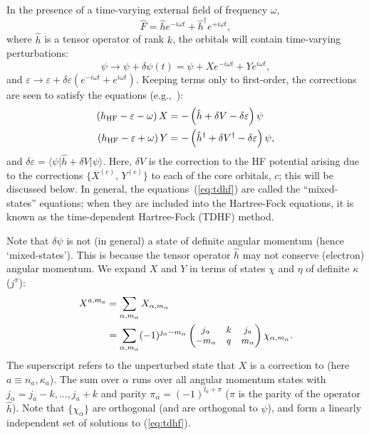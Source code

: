 \documentclass[10pt,twocolumn,a4paper]{article}%
\newcommand{\bra}[1]{\ensuremath{\langle #1|}}	%
\newcommand{\ket}[1]{\ensuremath{|#1\rangle}}	%
\newcommand{\threej}[6]{\small\ensuremath{\begin{pmatrix}#1&#2&#3\\#4&#5&#6\end{pmatrix}}}	%
\newcommand{\be}{\begin{equation}}
\newcommand{\ee}{\end{equation}}
\def\en{\ensuremath{\varepsilon}}
\renewcommand{\a}{\ensuremath{\alpha}}
\renewcommand{\k}{\ensuremath{\kappa}}
\newcommand{\w}{\ensuremath{\omega}}
\begin{document}
In the presence of a time-varying external field of frequency $\omega$,
\be
\hat F = \hat h e^{-i\w t} +  \hat h^\dag e^{+i\w t} ,
\ee
where $\hat h$ is a tensor operator of rank $k$, 
 the orbitals will contain time-varying perturbations:
\be\label{eq:tdhf-dPsi}
\psi \to \psi + \delta\psi(t) = \psi +  X e^{- i\w t}+ Y e^{ i\w t},
\ee
and $\en\to\en+\delta\en (e^{- i\w t}+ e^{ i\w t})$.
Keeping terms only to first-order, the corrections are seen to satisfy the equations (e.g.,~\cite{DzubaHFS1984}):
\begin{equation}\begin{split}
\label{eq:tdhf}
\left( h_{\rm HF} - \en -\w \right)X &= -\left(\hat h + \delta V - \delta \en \right)\psi \\
\left( h_{\rm HF} - \en +\w \right)Y &= -\left(\hat h^\dag + \delta V^\dag - \delta \en \right)\psi ,
\end{split}\end{equation}
and $\delta\en = \bra{\psi}\hat h + \delta V\ket{\psi}$.
%
Here, $\delta V$ is the correction to the HF potential arising due to the corrections $\{X^{(c)},\,Y^{(c)}\}$ to each of the core orbitals, $c$; this will be discussed below.
In general, the equations~(\ref{eq:tdhf}) are called the ``mixed-states'' equations; when they are included into the Hartree-Fock equations, it is known as the time-dependent Hartree-Fock (TDHF) method.

Note that $\delta\psi$ is not (in general) a state of definite angular momentum (hence `mixed-states').
This is because the tensor operator $\hat h$ may not conserve (electron) angular momentum.
We expand $X$ and $Y$ in terms of states $\chi$ and $\eta$ of definite $\k$ ($j^\pi$):
\begin{equation}\begin{split}
\label{eq:dPsi-pw}
X^{a,m_a} &= \sum_{\a,m_\a} X_{\a,m_\a}\\
 &= \sum_{\a,m_\a}(-1)^{j_\a-m_\a}\threej{j_\a}{k}{j_a}{-m_\a}{q}{m_\a}\chi_{\a, m_\a}.
\end{split}\end{equation}
The superscript refers to the unperturbed state that $X$ is a correction to (here $a\equiv n_a,\k_a$).
The sum over $\alpha$ runs over all angular momentum states with $j_\alpha = j_a - k, ..., j_a+k$ and parity $\pi_\alpha = (-1)^{l_a + \pi}$ ($\pi$ is the parity of the operator $\hat h$).
Note that $\{\chi_\a\}$ are orthogonal (and are orthogonal to $\psi$), and form a linearly independent set of solutions to (\ref{eq:tdhf}).
\end{document}
